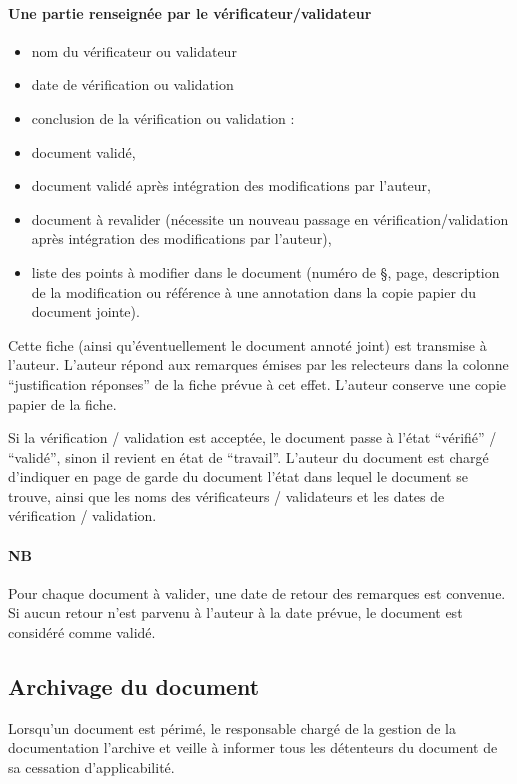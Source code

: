 \documentclass[a4paper]{article}
\begin{document}
\paragraph{Une partie renseignée par le vérificateur/validateur}

\begin{itemize}
\item nom du vérificateur ou validateur
\item date de vérification ou validation
\item conclusion de la vérification ou validation :
\item document validé,
\item document validé après intégration des modifications par l'auteur,
\item document à revalider (nécessite un nouveau passage en vérification/validation après intégration des modifications par l'auteur),
\item liste des points à modifier dans le document (numéro de §, page, description de la modification ou référence à une annotation dans la copie papier du document jointe).
\end{itemize}

Cette fiche (ainsi qu'éventuellement le document annoté joint) est transmise à l'auteur.
L'auteur répond aux remarques émises par les relecteurs dans la colonne ``justification réponses'' de la fiche prévue à cet effet.
L'auteur conserve une copie papier de la fiche.

Si la vérification / validation est acceptée, le document passe à l'état ``vérifié'' / ``validé'', sinon il revient en état de ``travail''.
L'auteur du document est chargé d'indiquer en page de garde du document l'état dans lequel le document se trouve, ainsi que les noms des vérificateurs / validateurs et les dates de vérification / validation.

\paragraph{NB} Pour chaque document à valider, une date de retour des remarques est convenue. Si aucun retour n'est parvenu à l'auteur à la date prévue, le document est considéré comme validé.

\subsection{Archivage du document}

Lorsqu'un document est périmé, le responsable chargé de la gestion de la documentation l'archive et veille à informer tous les détenteurs du document de sa cessation d'applicabilité.
\end{document}
